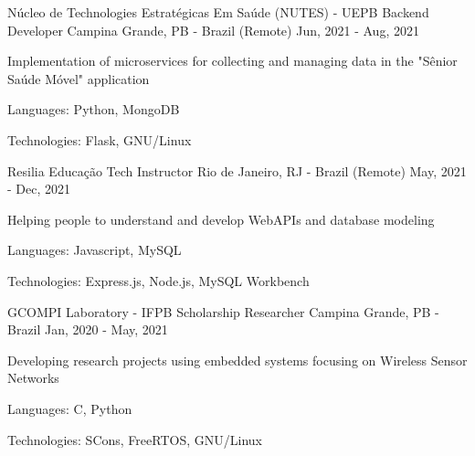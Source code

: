 \begin{cventries}
  \cventry
  {Núcleo de Technologies Estratégicas Em Saúde (NUTES) - UEPB} %
  {Backend Developer} %
  {Campina Grande, PB - Brazil (Remote)} %
  {Jun, 2021 - Aug, 2021} %
  {
    \begin{cvitems} %
      \item {Implementation of microservices for collecting and managing data in the "Sênior Saúde Móvel" application}
      \item {Languages: Python, MongoDB}
      \item {Technologies: Flask, GNU/Linux}
    \end{cvitems}
  }

  \cventry
  {Resilia Educação} %
  {Tech Instructor} %
  {Rio de Janeiro, RJ - Brazil (Remote)} %
  {May, 2021 - Dec, 2021} %
  {
    \begin{cvitems} %
      \item {Helping people to understand and develop WebAPIs and database modeling}
      \item {Languages: Javascript, MySQL}
      \item {Technologies: Express.js, Node.js, MySQL Workbench}
    \end{cvitems}
  }

  \cventry
  {GCOMPI Laboratory - IFPB} %
  {Scholarship Researcher} %
  {Campina Grande, PB - Brazil} %
  {Jan, 2020 - May, 2021} %
  {
    \begin{cvitems} %
      \item {Developing research projects using embedded systems focusing on Wireless Sensor Networks}
      \item {Languages: C, Python}
      \item {Technologies: SCons, FreeRTOS, GNU/Linux}
    \end{cvitems}
  }
\end{cventries}
